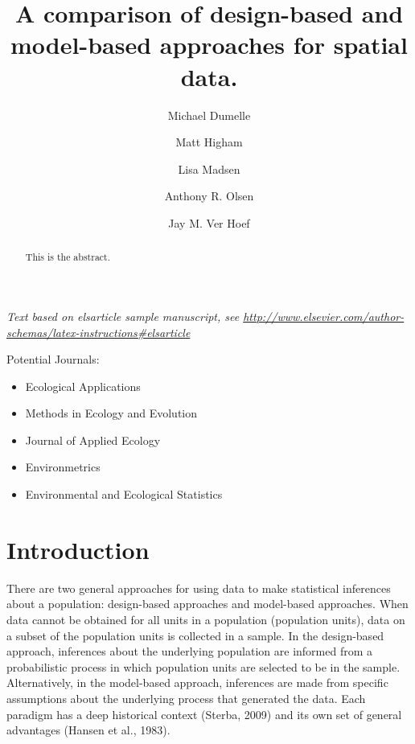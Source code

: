 \documentclass[]{elsarticle} %
\providecommand{\tightlist}{%
  \setlength{\itemsep}{0pt}\setlength{\parskip}{0pt}}
\begin{document}
\begin{frontmatter}

  \title{A comparison of design-based and model-based approaches for spatial
data.}
    \author[USEPA]{Michael Dumelle}
    \author[STLAW]{Matt Higham}
    \author[OSU]{Lisa Madsen}
  
    \author[USEPA]{Anthony R. Olsen}
  
    \author[NOAA]{Jay M. Ver Hoef}
  
      \address[USEPA]{United States Environmental Protection Agency, 200 SW 35th St,
Corvallis, Oregon, 97333}
    \address[STLAW]{Saint Lawrence University Department of Math, Computer Science, and
Statistics, 23 Romoda Drive, Canton, New York, 13617}
    \address[OSU]{Oregon State University Department of Statistics, 239 Weniger Hall,
Corvallis, Oregon, 97331}
    \address[NOAA]{Marine Mammal Laboratory, Alaska Fisheries Science Center, National
Oceanic and Atmospheric Administration, Seattle, Washington, 98115}
  
  \begin{abstract}
  This is the abstract.
  \end{abstract}
  
 \end{frontmatter}

\emph{Text based on elsarticle sample manuscript, see
\url{http://www.elsevier.com/author-schemas/latex-instructions\#elsarticle}}

Potential Journals:

\begin{itemize}
\tightlist
\item
  Ecological Applications
\item
  Methods in Ecology and Evolution
\item
  Journal of Applied Ecology
\item
  Environmetrics
\item
  Environmental and Ecological Statistics
\end{itemize}

\hypertarget{sec:introduction}{%
\section{Introduction}\label{sec:introduction}}

There are two general approaches for using data to make statistical
inferences about a population: design-based approaches and model-based
approaches. When data cannot be obtained for all units in a population
(population units), data on a subset of the population units is
collected in a sample. In the design-based approach, inferences about
the underlying population are informed from a probabilistic process in
which population units are selected to be in the sample. Alternatively,
in the model-based approach, inferences are made from specific
assumptions about the underlying process that generated the data. Each
paradigm has a deep historical context (Sterba, 2009) and its own set of
general advantages (Hansen et al., 1983).
\end{document}
